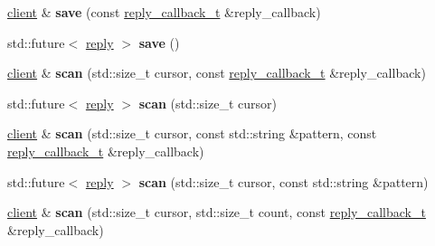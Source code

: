 \begin{DoxyCompactItemize}
\item 
\mbox{\label{classcpp__redis_1_1client_a01987f9fb419cfbce81872be8cd17619}} 
\hyperlink{classcpp__redis_1_1client}{client} \& {\bfseries save} (const \hyperlink{classcpp__redis_1_1client_a061a1140d36d2eaeda82b09a0bb3f9f2}{reply\+\_\+callback\+\_\+t} \&reply\+\_\+callback)
\item 
\mbox{\label{classcpp__redis_1_1client_a40f28e53d89e46aff3df4670736b1034}} 
std\+::future$<$ \hyperlink{classcpp__redis_1_1reply}{reply} $>$ {\bfseries save} ()
\item 
\mbox{\label{classcpp__redis_1_1client_ad4f6d98940e778ca95c802b210bd97e8}} 
\hyperlink{classcpp__redis_1_1client}{client} \& {\bfseries scan} (std\+::size\+\_\+t cursor, const \hyperlink{classcpp__redis_1_1client_a061a1140d36d2eaeda82b09a0bb3f9f2}{reply\+\_\+callback\+\_\+t} \&reply\+\_\+callback)
\item 
\mbox{\label{classcpp__redis_1_1client_a8196376dec0062d42f1199e7cec537d4}} 
std\+::future$<$ \hyperlink{classcpp__redis_1_1reply}{reply} $>$ {\bfseries scan} (std\+::size\+\_\+t cursor)
\item 
\mbox{\label{classcpp__redis_1_1client_ad663206aa569070b3f3f269ea43daff5}} 
\hyperlink{classcpp__redis_1_1client}{client} \& {\bfseries scan} (std\+::size\+\_\+t cursor, const std\+::string \&pattern, const \hyperlink{classcpp__redis_1_1client_a061a1140d36d2eaeda82b09a0bb3f9f2}{reply\+\_\+callback\+\_\+t} \&reply\+\_\+callback)
\item 
\mbox{\label{classcpp__redis_1_1client_aace969fbd009fb0a1fd29950f1e70d35}} 
std\+::future$<$ \hyperlink{classcpp__redis_1_1reply}{reply} $>$ {\bfseries scan} (std\+::size\+\_\+t cursor, const std\+::string \&pattern)
\item 
\mbox{\label{classcpp__redis_1_1client_a08887add5a0427c6e889e85c7178535d}} 
\hyperlink{classcpp__redis_1_1client}{client} \& {\bfseries scan} (std\+::size\+\_\+t cursor, std\+::size\+\_\+t count, const \hyperlink{classcpp__redis_1_1client_a061a1140d36d2eaeda82b09a0bb3f9f2}{reply\+\_\+callback\+\_\+t} \&reply\+\_\+callback)

\end{DoxyCompactItemize}
